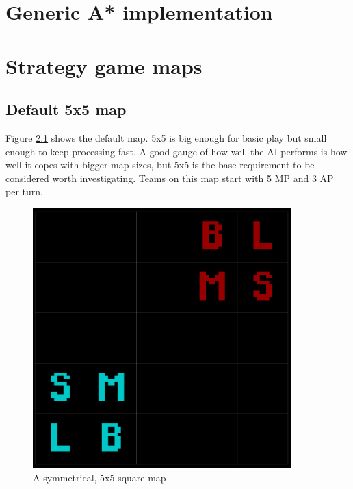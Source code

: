 \documentclass[11pt, a4paper]{report}
\begin{document}
\cleardoublepage
\begin{appendices}
\makeatletter
{}
\makeatother

\chapter{Generic A* implementation}
\label{appendix:genericAStarImplementation}

\linespread{0.8}

\linespread{1.5}

\chapter{Strategy game maps}
\label{appendix:strategyGameMaps}

\section{Default 5x5 map}
\label{sec:mapDefault5x5}

Figure \ref{fig:mapDefault5x5} shows the default map. 5x5 is big enough for basic play but small enough to keep processing fast. A good gauge of how well the AI performs is how well it copes with bigger map sizes, but 5x5 is the base requirement to be considered worth investigating. Teams on this map start with 5 MP and 3 AP per turn.

\begin{figure}[!h]
  \centering
  \includegraphics[width=10cm]{img/map_default_5x5.png}
  \caption{A symmetrical, 5x5 square map}
  \label{fig:mapDefault5x5}
\end{figure}


\end{appendices}
\end{document}
